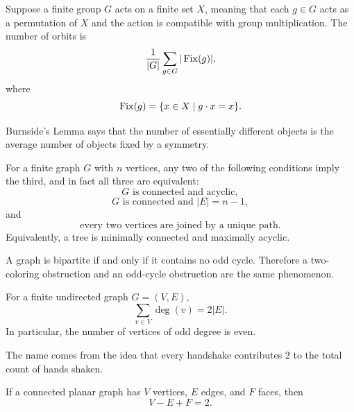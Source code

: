     \begin{theorem}
        Suppose a finite group $G$ acts on a finite set $X$, meaning that each
        $g\in G$ acts as a permutation of $X$ and the action is compatible with
        group multiplication. The number of orbits is
        \[
            \frac{1}{|G|}
            \sum_{g\in G}|\operatorname{Fix}(g)|,
        \]
        where
        \[
            \operatorname{Fix}(g)
            =
            \{x\in X\mid g\cdot x=x\}.
        \]
    \end{theorem}

    \begin{idea}
        Burnside's Lemma says that the number of essentially different objects
        is the average number of objects fixed by a symmetry.
    \end{idea}

    \begin{theorem}
        For a finite graph $G$ with $n$ vertices, any two of the following
        conditions imply the third, and in fact all three are equivalent:
        \[
            G\text{ is connected and acyclic},
        \]
        \[
            G\text{ is connected and }|E|=n-1,
        \]
        and
        \[
            \text{every two vertices are joined by a unique path}.
        \]
        Equivalently, a tree is minimally connected and maximally acyclic.
    \end{theorem}

    \begin{theorem}
        A graph is bipartite if and only if it contains no odd cycle. Therefore
        a two-coloring obstruction and an odd-cycle obstruction are the same
        phenomenon.
    \end{theorem}

    \begin{lemma}
        For a finite undirected graph $G=(V,E)$,
        \[
            \sum_{v\in V}\deg(v)=2|E|.
        \]
        In particular, the number of vertices of odd degree is even.
    \end{lemma}

    \begin{remark}
        The name comes from the idea that every handshake contributes $2$ to
        the total count of hands shaken.
    \end{remark}

    \begin{theorem}
        If a connected planar graph has $V$ vertices, $E$ edges, and $F$ faces,
        then
        \[
            V-E+F=2.
        \]
    \end{theorem}

